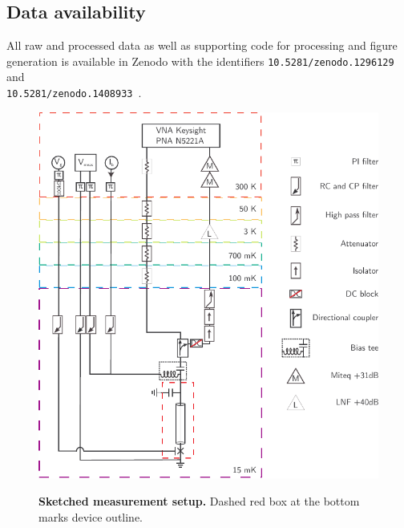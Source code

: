\subsection{Data availability}
All raw and processed data as well as supporting code for processing and figure generation is available in Zenodo with the identifiers \verb|10.5281/zenodo.1296129|~\cite{schmidtDataCodeBallistic2018} and \\
\verb|10.5281/zenodo.1408933|~\cite{jenkinsMeasurementAnalysisScripts2018}.


%



\clearpage
\pagebreak



\begin{figure}[]
	{\centering
		\includegraphics[width=\linewidth]{chapter-gJJ/figs/full_setup_cmyk}}
	\caption{{\bf Sketched measurement setup.}
		Dashed red box at the bottom marks device outline.
	}
	\label{gJJfig:setup_full}
\end{figure}

